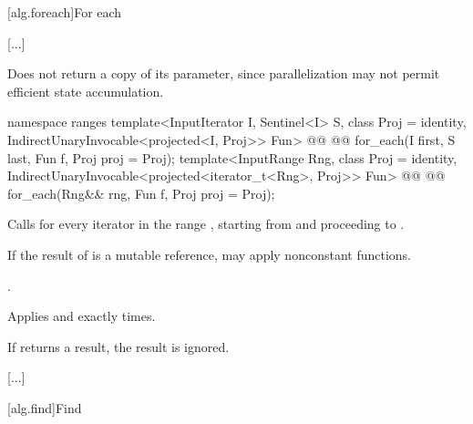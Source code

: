 [alg.foreach]{For each}

[...]

\setcounter{Paras}{9}
\begin{itemdescr}
\pnum
\begin{note}
Does not return a copy of its  parameter, since
parallelization may not permit efficient state accumulation.
\end{note}
\end{itemdescr}

\begin{addedblock}
%
\begin{itemdecl}
namespace ranges {
  template<InputIterator I, Sentinel<I> S, class Proj = identity,
      IndirectUnaryInvocable<projected<I, Proj>> Fun>
    @@
    @@
      for_each(I first, S last, Fun f, Proj proj = Proj{});
  template<InputRange Rng, class Proj = identity,
      IndirectUnaryInvocable<projected<iterator_t<Rng>, Proj>> Fun>
    @@
    @@
      for_each(Rng&& rng, Fun f, Proj proj = Proj{});
}
\end{itemdecl}

\begin{itemdescr}
\pnum
\effects
Calls
 for every iterator
 in the range
,
starting from
and proceeding to
.
\begin{note}
If the result of
 is a mutable reference,  may apply
nonconstant functions.
\end{note}

\pnum
\returns
{}.

\pnum
\complexity
Applies  and 
exactly
times.

\pnum
\remarks
If  returns a result, the result is ignored.
\end{itemdescr}
\end{addedblock}

[...]

[alg.find]{Find}


